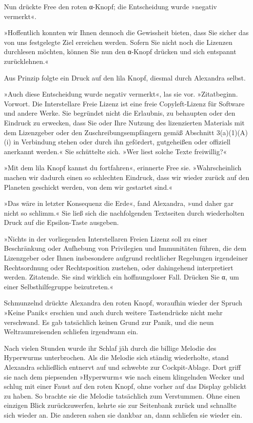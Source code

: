 Nun drückte Free den roten α-Knopf; die Entscheidung wurde »negativ vermerkt«.

»Hoffentlich konnten wir Ihnen dennoch die Gewissheit bieten, dass Sie sicher das von uns festgelegte Ziel erreichen werden. Sofern Sie nicht noch die Lizenzen durchlesen möchten, können Sie nun den α-Knopf drücken und sich entspannt zurücklehnen.«

Aus Prinzip folgte ein Druck auf den lila Knopf, diesmal durch Alexandra selbst.

»Auch diese Entscheidung wurde negativ vermerkt«, las sie vor. »Zitatbeginn. Vorwort. Die Interstellare Freie Lizenz ist eine freie Copyleft-Lizenz für Software und andere Werke. Sie begründet nicht die Erlaubnis, zu behaupten oder den Eindruck zu erwecken, dass Sie oder Ihre Nutzung des lizenzierten Materials mit dem Lizenzgeber oder den Zuschreibungsempfängern gemäß Abschnitt 3(a)(1)(A)(i) in Verbindung stehen oder durch ihn gefördert, gutgeheißen oder offiziell anerkannt werden.« Sie schüttelte sich. »Wer liest solche Texte freiwillig?«

»Mit dem lila Knopf kannst du fortfahren«, erinnerte Free sie. »Wahrscheinlich machen wir dadurch einen so schlechten Eindruck, dass wir wieder zurück auf den Planeten geschickt werden, von dem wir gestartet sind.«

»Das wäre in letzter Konsequenz die Erde«, fand Alexandra, »und daher gar nicht so schlimm.« Sie ließ sich die nachfolgenden Textseiten durch wiederholten Druck auf die Epsilon-Taste ausgeben.

»Nichts in der vorliegenden Interstellaren Freien Lizenz soll zu einer Beschränkung oder Aufhebung von Privilegien und Immunitäten führen, die dem Lizenzgeber oder Ihnen insbesondere aufgrund rechtlicher Regelungen irgendeiner Rechtsordnung oder Rechtsposition zustehen, oder dahingehend interpretiert werden. Zitatende. Sie sind wirklich ein hoffnungsloser Fall. Drücken Sie α, um einer Selbsthilfegruppe beizutreten.«

Schmunzelnd drückte Alexandra den roten Knopf, woraufhin wieder der Spruch »Keine Panik« erschien und auch durch weitere Tastendrücke nicht mehr verschwand. Es gab tatsächlich keinen Grund zur Panik, und die neun Weltraumreisenden schliefen irgendwann ein.

Nach vielen Stunden wurde ihr Schlaf jäh durch die billige Melodie des Hyperwurms unterbrochen. Als die Melodie sich ständig wiederholte, stand Alexandra schließlich entnervt auf und schwebte zur Cockpit-Ablage. Dort griff sie nach dem piepsenden »Hyperwurm« wie nach einem klingelnden Wecker und schlug mit einer Faust auf den roten Knopf, ohne vorher auf das Display geblickt zu haben. So brachte sie die Melodie tatsächlich zum Verstummen. Ohne einen einzigen Blick zurückzuwerfen, kehrte sie zur Seitenbank zurück und schnallte sich wieder an. Die anderen sahen sie dankbar an, dann schliefen sie wieder ein.

